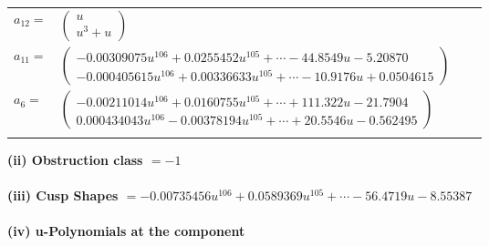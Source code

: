 \documentclass[1p]{elsarticle_modified}
\theoremstyle{definition}
\begin{document}
\begin{tabular}{m{7pt} m{180pt} m{7pt} m{180pt} }
\flushright $a_{12}=$&$\begin{pmatrix}u\\u^3+u\end{pmatrix}$ \\
\flushright $a_{11}=$&$\begin{pmatrix}-0.00309075 u^{106}+0.0255452 u^{105}+\cdots-44.8549 u-5.20870\\-0.000405615 u^{106}+0.00336633 u^{105}+\cdots-10.9176 u+0.0504615\end{pmatrix}$ \\
\flushright $a_{6}=$&$\begin{pmatrix}-0.00211014 u^{106}+0.0160755 u^{105}+\cdots+111.322 u-21.7904\\0.000434043 u^{106}-0.00378194 u^{105}+\cdots+20.5546 u-0.562495\end{pmatrix}$\\&\end{tabular}
\flushleft \textbf{(ii) Obstruction class $= -1$}\\~\\
\flushleft \textbf{(iii) Cusp Shapes $= -0.00735456 u^{106}+0.0589369 u^{105}+\cdots-56.4719 u-8.55387$}\\~\\
\newpage\renewcommand{\arraystretch}{1}
\flushleft \textbf{(iv) u-Polynomials at the component}\newline \\
\end{document}
